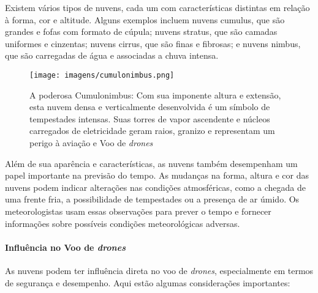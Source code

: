 \documentclass[a4paper, 12pt, onecolumn,singlespacing]{article}
\begin{document}
	Existem vários tipos de nuvens, cada um com características distintas em relação à forma, cor e altitude. Alguns exemplos incluem nuvens cumulus, que são grandes e fofas com formato de cúpula; nuvens stratus, que são camadas uniformes e cinzentas; nuvens cirrus, que são finas e fibrosas; e nuvens nimbus, que são carregadas de água e associadas a chuva intensa.
	
	\begin{figure}[h]
		\centering
		\texttt{[image: imagens/cumulonimbus.png]}
		\caption{A poderosa Cumulonimbus: Com sua imponente altura e extensão, esta nuvem densa e verticalmente desenvolvida é um símbolo de tempestades intensas. Suas torres de vapor ascendente e núcleos carregados de eletricidade geram raios, granizo e representam um perigo à aviação e Voo de \textit{drones}}
		\label{fig:nuvens}
	\end{figure}
	
	Além de sua aparência e características, as nuvens também desempenham um papel importante na previsão do tempo. As mudanças na forma, altura e cor das nuvens podem indicar alterações nas condições atmosféricas, como a chegada de uma frente fria, a possibilidade de tempestades ou a presença de ar úmido. Os meteorologistas usam essas observações para prever o tempo e fornecer informações sobre possíveis condições meteorológicas adversas.
	
	\paragraph{Influência no Voo de \textit{drones}}
	
	As nuvens podem ter influência direta no voo de \textit{drones}, especialmente em termos de segurança e desempenho. Aqui estão algumas considerações importantes:
	
\end{document}
